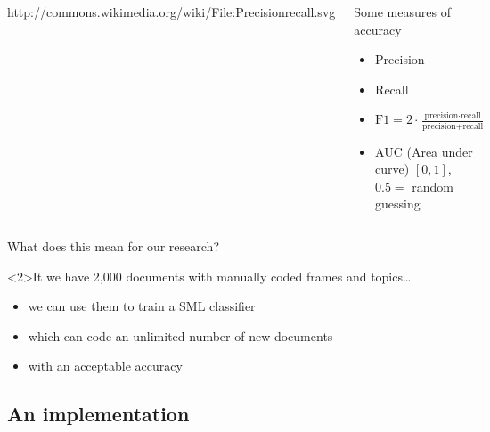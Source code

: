 \documentclass{beamer}
\begin{document}
\begin{frame}[plain]
\begin{columns}[]

{\tiny{http://commons.wikimedia.org/wiki/File:Precisionrecall.svg}}

\begin{block}{Some measures of accuracy}
\begin{itemize}
\item Precision
\item Recall
\item $\text{F1}=2\cdot \frac{\text{precision}\cdot \text{recall}}{\text{precision}+\text{recall}}$%
\item AUC (Area under curve)
$[0,1]$, $0.5=$ random guessing
\end{itemize}
\end{block}


\end{columns}

\end{frame}





\begin{frame}{What does this mean for our research?}
\begin{block}<2>{It we have 2,000 documents with manually coded frames and topics\ldots}
\begin{itemize}
\item we can use them to train a SML classifier
\item which can code an unlimited number of new documents
\item with an acceptable accuracy
\end{itemize}
\end{block}
\end{frame}



\subsection{An implementation}
\end{document}
